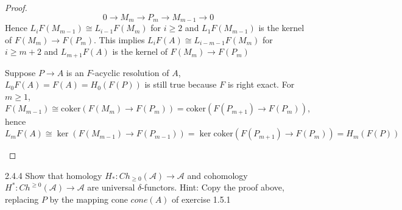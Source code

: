 \documentclass[../main.tex]{subfiles}
\begin{document}
\begin{proof}
\[0\to M_m\to P_m\to M_{m-1}\to0\]
Hence $L_iF(M_{m-1})\cong L_{i-1}F(M_m)$ for $i\geq2$ and $L_1F(M_{m-1})$ is the kernel of $F(M_m)\to F(P_m)$. This implies $L_iF(A)\cong L_{i-m-1}F(M_m)$ for $i\geq m+2$ and $L_{m+1}F(A)$ is the kernel of $F(M_m)\to F(P_m)$ \par
Suppose $P\to A$ is an $F$-acyclic resolution of $A$, $L_0F(A)=F(A)=H_0(F(P))$ is still true because $F$ is right exact. For $m\geq1$, $F(M_{m-1})\cong\mathrm{coker}(F(M_{m})\to F(P_m))=\mathrm{coker}(F(P_{m+1})\to F(P_m))$, hence $L_{m}F(A)\cong\ker(F(M_{m-1})\to F(P_{m-1}))=\ker\mathrm{coker}(F(P_{m+1})\to F(P_m))=H_m(F(P))$
\begin{center}
\end{center}
\end{proof}

\begin{customexercise}{2.4.4}
Show that homology $H_*:Ch_{\geq0}(\mathscr A)\to\mathscr A$ and cohomology $H^*:Ch^{\geq0}(\mathscr A)\to\mathscr A$ are universal $\delta$-functors. Hint: Copy the proof above, replacing $P$ by the mapping cone $cone(A)$ of exercise 1.5.1
\end{customexercise}
\end{document}
